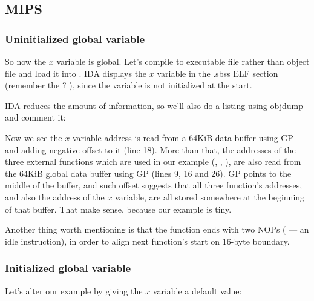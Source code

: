 \subsection{MIPS}

\subsubsection{Uninitialized global variable}

So now the $x$ variable is global.
Let's compile to executable file rather than object file and load it into \IDA.
IDA displays the $x$ variable in the .sbss ELF section (remember the ? ),
since the variable is not initialized at the start.



IDA reduces the amount of information, so we'll also do a listing using objdump and comment it:



Now we see the $x$ variable address is read from a 64KiB data buffer using GP and adding negative offset to it (line 18).
More than that, the addresses of the three external functions  which are used in our example (\puts, \scanf, \printf), are also read from the 64KiB global data buffer using GP (lines 9, 16 and 26).
GP points to the middle of the buffer, and such offset suggests that all three function's addresses,
and also the address of the $x$ variable, are all stored somewhere at the beginning of that buffer.
That make sense, because our example is tiny.


Another thing worth mentioning is that the function ends with two \ac{NOP}s ( --- an idle instruction), in order to align next function's start on 16-byte boundary.

\subsubsection{Initialized global variable}

Let's alter our example by giving the $x$ variable a default value:



